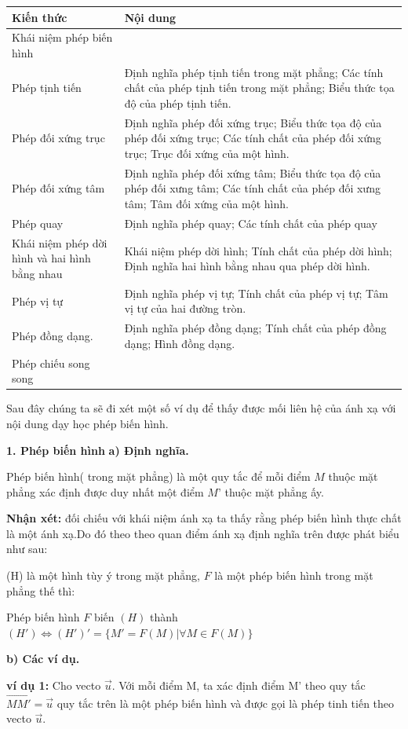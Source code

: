 \documentclass[12pt,oneside,a4paper,reqno]{book}
\begin{document}
\begin{tabular}{|p{4.5cm}|p{9cm}|}
\hline
\textbf{Kiến thức } & \textbf{Nội dung} \tabularnewline
\hline
Khái niệm phép biến hình  &  \tabularnewline
\hline
  Phép tịnh tiến & Định nghĩa phép tịnh tiến trong mặt phẳng; Các tính chất của phép tịnh tiến trong mặt phẳng; Biểu thức tọa độ của phép tịnh tiến.   \tabularnewline 
   \hline
Phép đối xứng trục& Định nghĩa phép đối xứng trục; Biểu thức tọa độ của phép đối xứng trục; Các tính chất của phép đối xứng trục; Trục đối xứng của một hình. \tabularnewline

\hline
Phép đối xứng tâm&Định nghĩa phép đối xứng tâm; Biểu thức tọa độ của phép đối xưng tâm; Các tính chất của phép đối xưng tâm; Tâm đối xứng của một hình. \tabularnewline
\hline
Phép quay&Định nghĩa phép quay; Các tính chất của phép quay \tabularnewline 
\hline
Khái niệm phép dời hình và hai hình bằng nhau&Khái niệm phép dời hình; Tính chất của phép dời hình; Định nghĩa hai hình bằng nhau qua phép dời hình. \tabularnewline
\hline 
Phép vị tự&Định nghĩa phép vị tự; Tính chất của phép vị tự; Tâm vị tự của hai đường tròn. \tabularnewline
\hline
Phép đồng dạng.&Định nghĩa phép đồng dạng; Tính chất của phép đồng dạng; Hình đồng dạng. \tabularnewline
\hline
Phép chiếu song song& \tabularnewline
\hline
\end{tabular}

Sau đây chúng ta sẽ đi xét một số ví dụ để thấy được mối liên hệ của ánh xạ với nội dung dạy học phép biến hình.

\textbf{1. Phép biến hình}
\textbf{a) Định nghĩa.}

Phép biến hình( trong mặt phẳng) là một quy tắc để mỗi điểm $M$ thuộc mặt phẳng xác định được duy nhất một điểm $M’$ thuộc mặt phẳng ấy.

\textbf{Nhận xét:} đối chiếu với khái niệm ánh xạ ta thấy rằng phép biến hình thực chất là một ánh xạ.Do đó theo theo quan điểm ánh xạ định nghĩa trên được phát biểu như sau: 

(H) là một hình tùy ý trong mặt phẳng, $F$ là một phép biến hình trong mặt phẳng thế thì: 

\centerline {}

Phép biến hình  $F$ biến $(H)$ thành $(H') \Leftrightarrow (H') '=\{M'=F(M)|\forall M\in F(M)\}$

\textbf{b) Các ví dụ.}

\textbf{ví dụ 1:} Cho vecto $\overrightarrow{u}$. Với mỗi điểm M, ta xác định điểm M’ theo quy tắc $\overrightarrow{MM'} =\overrightarrow{u}$
quy tắc trên là một phép biến hình và được gọi là phép tinh tiến theo vecto $\overrightarrow{u}$.
\end{document}
